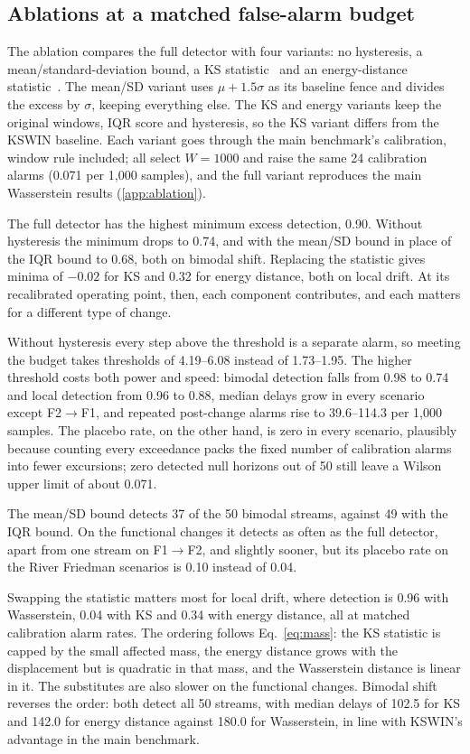 \documentclass[preprint,12pt]{elsarticle}
\begin{document}
\subsection{Ablations at a matched false-alarm budget}
\label{sec:ablation}
The ablation compares the full detector with four variants: no hysteresis, a mean/standard-deviation bound, a KS statistic~\cite{massey1951kolmogorov} and an energy-distance statistic~\cite{szekely2013energy}. The mean/SD variant uses $\mu+1.5\sigma$ as its baseline fence and divides the excess by $\sigma$, keeping everything else. The KS and energy variants keep the original windows, IQR score and hysteresis, so the KS variant differs from the KSWIN baseline. Each variant goes through the main benchmark's calibration, window rule included; all select $W=1000$ and raise the same 24 calibration alarms (0.071 per 1,000 samples), and the full variant reproduces the main Wasserstein results (\ref{app:ablation}).

The full detector has the highest minimum excess detection, 0.90. Without hysteresis the minimum drops to 0.74, and with the mean/SD bound in place of the IQR bound to 0.68, both on bimodal shift. Replacing the statistic gives minima of $-0.02$ for KS and 0.32 for energy distance, both on local drift. At its recalibrated operating point, then, each component contributes, and each matters for a different type of change.

Without hysteresis every step above the threshold is a separate alarm, so meeting the budget takes thresholds of 4.19--6.08 instead of 1.73--1.95. The higher threshold costs both power and speed: bimodal detection falls from 0.98 to 0.74 and local detection from 0.96 to 0.88, median delays grow in every scenario except F2$\to$F1, and repeated post-change alarms rise to 39.6--114.3 per 1,000 samples. The placebo rate, on the other hand, is zero in every scenario, plausibly because counting every exceedance packs the fixed number of calibration alarms into fewer excursions; zero detected null horizons out of 50 still leave a Wilson upper limit of about 0.071.

The mean/SD bound detects 37 of the 50 bimodal streams, against 49 with the IQR bound. On the functional changes it detects as often as the full detector, apart from one stream on F1$\to$F2, and slightly sooner, but its placebo rate on the River Friedman scenarios is 0.10 instead of 0.04.

Swapping the statistic matters most for local drift, where detection is 0.96 with Wasserstein, 0.04 with KS and 0.34 with energy distance, all at matched calibration alarm rates. The ordering follows Eq.~\eqref{eq:mass}: the KS statistic is capped by the small affected mass, the energy distance grows with the displacement but is quadratic in that mass, and the Wasserstein distance is linear in it. The substitutes are also slower on the functional changes. Bimodal shift reverses the order: both detect all 50 streams, with median delays of 102.5 for KS and 142.0 for energy distance against 180.0 for Wasserstein, in line with KSWIN's advantage in the main benchmark.
\end{document}
